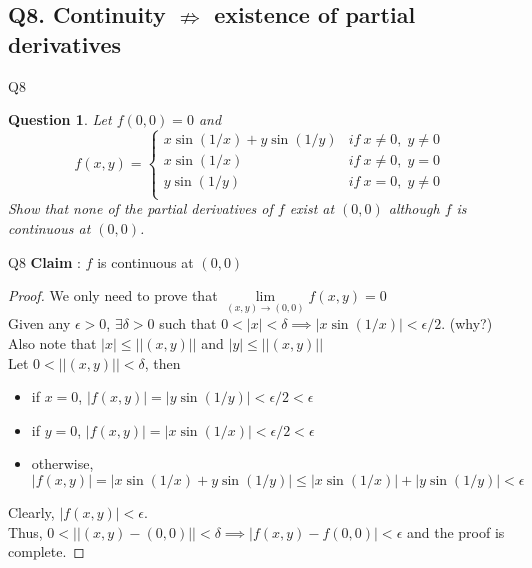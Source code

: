 \documentclass[aspectratio=169]{beamer}
\newtheorem{qsn}{Question}
\newcommand{\norm}[1]{|#1|}
\newcommand{\normtwo}[1]{||#1||}
\begin{document}
\subsection{Q8. Continuity $\nRightarrow$ existence of partial derivatives}
\begin{frame}{Q8}
    \begin{qsn}
        Let $f(0,0) = 0$ and 
        \begin{equation*}
            f(x,y) = 
            \begin{cases}
                    x\sin(1/x) + y\sin(1/y) & if~x\neq 0,\; y \ne 0\\
                    x \sin(1/x) & if~x\neq 0,\; y = 0\\
                    y \sin(1/y) & if~x= 0,\; y \neq 0\\
            \end{cases}
        \end{equation*}
        Show that none of the partial derivatives of $f$ exist at $(0, 0)$ although $f$ is continuous at $(0, 0)$.
    \end{qsn}
\end{frame}
\begin{frame}{Q8}
    \textbf{Claim} : $f$ is continuous at $(0,0)$\\
    \pause
    \begin{proof}
    We only need to prove that $\lim\limits_{(x,y) \to (0,0)} f(x,y) = 0$\\
    \pause
    Given any $\epsilon > 0$, $\exists\delta > 0$ such that $0<|x|<\delta\implies |x\sin(1/x)| < \epsilon/2$. (why?)\\
    \pause
    Also note that $\norm{x}\leq\normtwo{(x,y)}$ and $\norm{y}\leq \normtwo{(x,y)}$\\
    \pause
    Let $0<\normtwo{(x,y)}<\delta$, then
    \begin{itemize}
        \item if $x=0$, $\norm{f(x,y)} = \norm{y\sin(1/y)}<\epsilon/2<\epsilon$
        \item if $y=0$, $\norm{f(x,y)} = \norm{x\sin(1/x)}<\epsilon/2<\epsilon$
        \item otherwise, $\norm{f(x,y)} = \norm{x\sin(1/x)+y\sin(1/y)} \leq \norm{x\sin(1/x)}+\norm{y\sin(1/y)} <\epsilon$
    \end{itemize}
    \pause
     Clearly, $\norm{f(x,y)} < \epsilon$.\\
    \pause
    Thus, $0<\normtwo{(x,y)-(0,0)}<\delta \implies \norm{f(x,y)-f(0,0)}<\epsilon$ and the proof is complete.
    \end{proof}
\end{frame}
\end{document}
